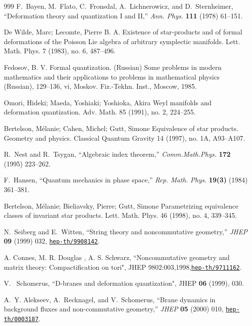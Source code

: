 \documentclass{article}
\begin{document}
\begin{thebibliography}{999}
F.~Bayen, M.~Flato, C.~Fronsdal, A.~Lichnerowicz, and D.~Sternheimer,
  ``Deformation theory and quantization {I} and {II},'' {\em Ann. Phys.} {\bf
  111} (1978) 61--151.
  
   De Wilde, Marc; Lecomte, Pierre B. A. Existence of star-products and of formal deformations of the Poisson Lie algebra of arbitrary symplectic manifolds.  Lett. Math. Phys.  7  (1983),  no. 6, 487--496. 

 Fedosov, B. V. Formal quantization. (Russian)  Some problems in modern mathematics and their applications to problems in mathematical physics (Russian),  129--136, vi, Moskov. Fiz.-Tekhn. Inst., Moscow, 1985.

 Omori, Hideki; Maeda, Yoshiaki; Yoshioka, Akira Weyl manifolds and deformation quantization.  Adv. Math.  85  (1991),  no. 2, 224--255.

 Bertelson, M\'elanie; Cahen, Michel; Gutt, Simone
Equivalence of star products. 
Geometry and physics.
Classical Quantum Gravity 14 (1997), no. 1A, A93--A107. 

 R.~Nest and R.~Tsygan, ``Algebraic index theorem,'' {\em Comm.Math.Phys.} {\bf
  172} (1995) 223--262.

F.~Hansen, ``Quantum mechanics in phase space,'' {\em Rep. Math. Phys.} {\bf
  19(3)} (1984) 361--381.

 Bertelson, M\'elanie; Bieliavsky, Pierre; Gutt, Simone Parametrizing equivalence classes of invariant star products.  Lett. Math. Phys.  46  (1998),  no. 4, 339--345.

N.~Seiberg and E.~Witten, ``String theory and noncommutative geometry,'' {\em
  JHEP} {\bf 09} (1999) 032,
\href{http://www.arXiv.org/abs/hep-th/9908142}{{\tt hep-th/9908142}}.

A. Connes, M. R. Douglas , A. S. Schwarz, ``Noncommutative geometry and matrix theory: Compactification on tori", JHEP 9802:003,1998,\href{http://www.arXiv.org/abs/hep-th/9711162}{{\tt hep-th/9711162}}.
 
V.~ Schomerus, ``D-branes and deformation quantization", JHEP
  \textbf{06} (1999), 030.

A.~Y. Alekseev, A.~Recknagel, and V.~Schomerus, ``Brane dynamics in background
  fluxes and non-commutative geometry,'' {\em JHEP} {\bf 05} (2000) 010,
\href{http://www.arXiv.org/abs/hep-th/0003187}{{\tt hep-th/0003187}}.
 

\end{thebibliography}
\end{document}
